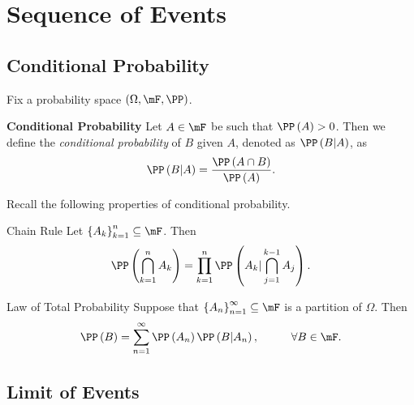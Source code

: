 \documentclass[stat901]{subfiles}
\begin{document}
    \section{Sequence of Events}

    \subsection{Conditional Probability}

    Fix a probability space $\left( \Omega,\mF,\PP \right)$.
    
    \begin{definition}{\textbf{Conditional Probability}}
        Let $A\in\mF$ be such that $\PP\left( A \right) > 0$. Then we define the \emph{conditional probability} of $B$ given $A$, denoted as $\PP\left( B|A \right)$, as
        \begin{equation*}
            \PP\left( B|A \right) = \frac{\PP\left( A\cap B \right)}{\PP\left( A \right)}.
        \end{equation*}
    \end{definition}

    \np Recall the following properties of conditional probability.

    \begin{prop}{Chain Rule}
        Let $\left\lbrace A_k \right\rbrace^{n}_{k=1}\subseteq\mF$. Then
        \begin{equation*}
            \PP\left( \bigcap^{n}_{k=1}A_k \right) = \prod^{n}_{k=1} \PP\left( A_k | \bigcap^{k-1}_{j=1} A_j \right).
        \end{equation*}
    \end{prop}

    \rruleline

    \begin{prop}{Law of Total Probability}
        Suppose that $\left\lbrace A_n \right\rbrace^{\infty}_{n=1}\subseteq\mF$ is a partition of $\Omega$. Then
        \begin{equation*}
            \PP\left( B \right) = \sum^{\infty}_{n=1} \PP\left( A_n \right)\PP\left( B|A_n \right),\hspace{1cm}\forall B\in\mF.
        \end{equation*}
    \end{prop}
    
    \rruleline
    
    \subsection{Limit of Events}
    
\end{document}
